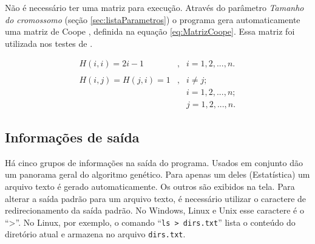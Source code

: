 	Não é necessário ter uma matriz para execução. Através do parâmetro \emph{Tamanho do cromossomo} (seção \ref{sec:listaParametros}) o programa gera automaticamente uma matriz de Coope \cite{Coope1977}, definida na equação \ref{eq:MatrizCoope}. Essa matriz foi utilizada nos testes de \cite{metodo2011}.
	
	\begin{equation}\label{eq:MatrizCoope}
		\begin{array}{ccl}
			H(i,i) = 2i - 1 			& , & i = 1, 2, ..., n. \\
														&		&		\\
			H(i,j) = H(j,i) = 1		& , & i \neq j; \\
														&		& i = 1, 2, ..., n; \\
														&		& j = 1, 2, ..., n.
		\end{array}
	\end{equation}
	
\subsection{Informações de saída}
		
Há cinco grupos de informações na saída do programa. Usados em conjunto dão um panorama geral do algoritmo genético. Para apenas um deles (Estatística) um arquivo texto é gerado automaticamente. Os outros são exibidos na tela. Para alterar a saída padrão para um arquivo texto, é necessário utilizar o caractere de redirecionamento da saída padrão. No Windows, Linux e Unix esse caractere é o ``>''. No Linux, por exemplo, o comando ``\texttt{ls > dirs.txt}'' lista o conteúdo do diretório atual e armazena no arquivo \texttt{dirs.txt}.

